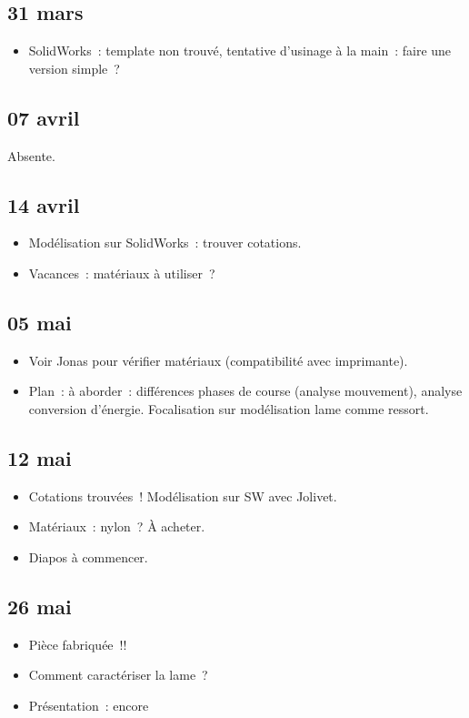 \documentclass[a4paper, 11pt, final, garamond]{book}
\begin{document}
\subsection{31 mars}
\begin{itemize}
  \item SolidWorks~: template non trouvé, tentative d'usinage à la main~: faire
    une version simple~?
\end{itemize}

\subsection{07 avril}
\begin{center}
  Absente.
\end{center}

\subsection{14 avril}
\begin{itemize}
  \item Modélisation sur SolidWorks~: trouver cotations.
  \item Vacances~: matériaux à utiliser~?
\end{itemize}

\subsection{05 mai}
\begin{itemize}
  \item Voir Jonas pour vérifier matériaux (compatibilité avec imprimante).
  \item Plan~: à aborder~: différences phases de course (analyse mouvement),
    analyse conversion d'énergie. Focalisation sur modélisation lame comme
    ressort.
\end{itemize}

\subsection{12 mai}
\begin{itemize}
  \item Cotations trouvées~! Modélisation sur SW avec Jolivet.
  \item Matériaux~: nylon~? À acheter.
  \item Diapos à commencer.
\end{itemize}

\subsection{26 mai}
\begin{itemize}
  \item Pièce fabriquée~!!
  \item Comment caractériser la lame~?
  \item Présentation~: encore
\end{itemize}
\end{document}
